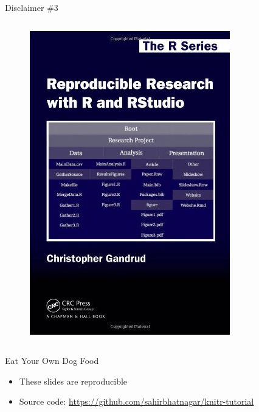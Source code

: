 \documentclass[10pt]{beamer}\usepackage[]{graphicx}\usepackage[]{color}
\begin{document}
\begin{frame}{Disclaimer \#3}
\begin{columns}[c]
\begin{figure}
\includegraphics[width=0.6\columnwidth]{chris.png}
\end{figure}
\end{columns}

\end{frame}


\begin{frame}{Eat Your Own Dog Food}

\begin{itemize}
\item These slides are reproducible
\item Source code: \href{https://github.com/sahirbhatnagar/knitr-tutorial}{https://github.com/sahirbhatnagar/knitr-tutorial}
\end{itemize}

\end{frame}
\end{document}

